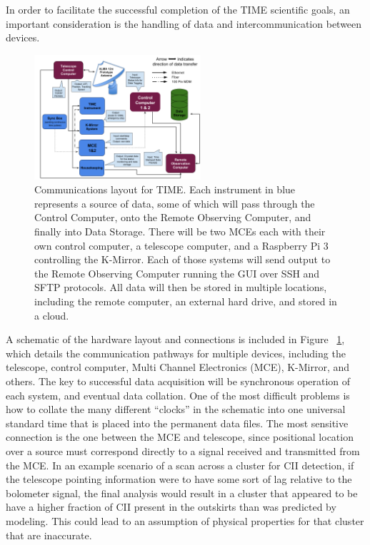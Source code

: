 \documentclass[manuscript]{aastex}
\begin{document}
In order to facilitate the successful completion of the TIME scientific goals, an important consideration is the handling of data and intercommunication between devices.
\begin{figure}
\vspace{-0.8cm}
  \begin{center}
    \includegraphics[width=0.55\textwidth]{km9.png}
  \end{center}
  \caption[TIME Control Flow Diagram]{Communications layout for TIME. Each instrument in blue represents a source of data, some of which will pass through the Control Computer, onto the Remote Observing Computer, and finally into Data Storage. There will be two MCEs each with their own control computer, a telescope computer, and a Raspberry Pi 3 controlling the K-Mirror. Each of those systems will send output to the Remote Observing Computer running the GUI over SSH and SFTP protocols. All data will then be stored in multiple locations, including the remote computer, an external hard drive, and stored in a cloud.}
  \label{fig:km9}
\end{figure}
 A schematic of the hardware layout and connections is included in Figure ~\ref{fig:km9}, which details the communication pathways for multiple devices, including the telescope, control computer, Multi Channel Electronics (MCE), K-Mirror, and others. The key to successful data acquisition will be synchronous operation of each system, and eventual data collation. One of the most difficult problems is how to collate the many different ``clocks'' in the schematic into one universal standard time that is placed into the permanent data files. The most sensitive connection is the one between the MCE and telescope, since positional location over a source must correspond directly to a signal received and transmitted from the MCE. In an example scenario of a scan across a cluster for CII detection, if the telescope pointing information were to have some sort of lag relative to the bolometer signal, the final analysis would result in a cluster that appeared to be have a higher fraction of CII present in the outskirts than was predicted by modeling. This could lead to an assumption of physical properties for that cluster that are inaccurate. 
 
\end{document}
